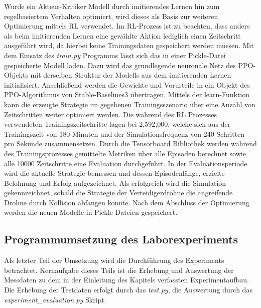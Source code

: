 Wurde ein Akteur-Kritiker Modell durch imitierendes Lernen hin zum regelbasiertem Verhalten optimiert, wird dieses als Basis zur weiteren Optimierung mittels RL verwendet.
Im RL-Prozess ist zu beachten, dass anders als beim imitierenden Lernen eine gewählte Aktion lediglich einen Zeitschritt ausgeführt wird, da hierbei keine Trainingsdaten gespeichert werden müssen.
Mit dem Einsatz des \textit{train.py} Programms lässt sich das in einer Pickle-Datei gespeicherte Modell laden.
Dazu wird das grundlegende neuronale Netz des PPO-Objekts mit derselben Struktur der Modells aus dem imitierenden Lernen initialisiert. 
Anschließend werden die Gewichte und Vorurteile in ein Objekt des PPO-Algorithmus von Stable-Baselines3 übertragen.
Mittels der learn-Funktion kann die erzeugte Strategie im gegebenen Trainingsszenario über eine Anzahl von Zeitschritten weiter optimiert werden.
Die während des RL Prozesses verwendeten Trainingszeitschritte lagen bei 2,592,000, welche sich aus der Trainingszeit von 180 Minuten und der Simulationsfrequenz von 240 Schritten pro Sekunde zusammensetzen.
Durch die Tensorboard Bibliothek werden während des Trainingsprozesses gemittelte Metriken über alle Episoden berechnet sowie alle 10000 Zeitschritte eine Evaluation durchgeführt.
In der Evaluationsperiode wird die aktuelle Strategie bemessen und dessen Episodenlänge, erzielte Belohnung und Erfolg aufgezeichnet.
Als erfolgreich wird die Simulation gekennzeichnet, sobald die Strategie der Verteidigerdrohne die angreifende Drohne durch Kollision abfangen konnte.
Nach dem Abschluss der Optimierung werden die neuen Modelle in Pickle Dateien gespeichert. 

\subsection{Programmumsetzung des Laborexperiments}

Als letzter Teil der Umsetzung wird die Durchführung des Experiments betrachtet.
Kernaufgabe dieses Teils ist die Erhebung und Auswertung der Messdaten zu dem in der Einleitung des Kapitels verfassten Experimentaufbau.
Die Erhebung der Testdaten erfolgt durch das \textit{test.py}, die Auswertung durch das \textit{experiment\_evaluation.py} Skript.

